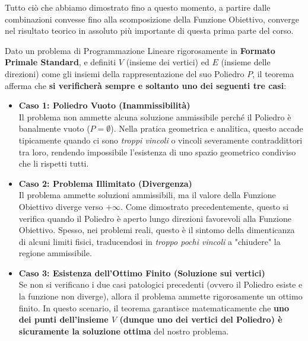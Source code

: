 \documentclass[12pt, a4paper]{article}
\begin{document}
	Tutto ciò che abbiamo dimostrato fino a questo momento, a partire dalle combinazioni convesse fino alla scomposizione della Funzione Obiettivo, converge nel risultato teorico in assoluto più importante di questa prima parte del corso. 
	
	Dato un problema di Programmazione Lineare rigorosamente in \textbf{Formato Primale Standard}, e definiti $V$ (insieme dei vertici) ed $E$ (insieme delle direzioni) come gli insiemi della rappresentazione del suo Poliedro $P$, il teorema afferma che \textbf{si verificherà sempre e soltanto uno dei seguenti tre casi}:
	
	\begin{itemize}[label=\textcolor{titlecolor}{\Large\textbullet}, itemsep=8pt, parsep=2pt, leftmargin=1.5cm]
		
		\item \textbf{Caso 1: Poliedro Vuoto (Inammissibilità)}\\
		Il problema non ammette alcuna soluzione ammissibile perché il Poliedro è banalmente vuoto ($P = \emptyset$). Nella pratica geometrica e analitica, questo accade tipicamente quando ci sono \textit{troppi vincoli} o vincoli severamente contraddittori tra loro, rendendo impossibile l'esistenza di uno spazio geometrico condiviso che li rispetti tutti.
		
		\item \textbf{Caso 2: Problema Illimitato (Divergenza)}\\
		Il problema ammette soluzioni ammissibili, ma il valore della Funzione Obiettivo diverge verso $+\infty$. Come dimostrato precedentemente, questo si verifica quando il Poliedro è aperto lungo direzioni favorevoli alla Funzione Obiettivo. Spesso, nei problemi reali, questo è il sintomo della dimenticanza di alcuni limiti fisici, traducendosi in \textit{troppo pochi vincoli} a "chiudere" la regione ammissibile.
		
		\item \textbf{Caso 3: Esistenza dell'Ottimo Finito (Soluzione sui vertici)}\\
		Se non si verificano i due casi patologici precedenti (ovvero il Poliedro esiste e la funzione non diverge), allora il problema ammette rigorosamente un ottimo finito. In questo scenario, il teorema garantisce matematicamente che \textbf{uno dei punti dell'insieme $V$ (dunque uno dei vertici del Poliedro) è sicuramente la soluzione ottima} del nostro problema.
		
	\end{itemize}
	\vspace{0.4cm}
\end{document}
